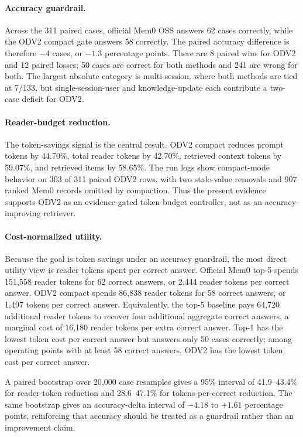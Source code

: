 \documentclass{article}
\begin{document}
\paragraph{Accuracy guardrail.}
Across the 311 paired cases, official Mem0 OSS answers 62 cases correctly, while the ODV2 compact gate answers 58 correctly. The paired accuracy difference is therefore $-4$ cases, or $-1.3$ percentage points. There are 8 paired wins for ODV2 and 12 paired losses; 50 cases are correct for both methods and 241 are wrong for both. The largest absolute category is multi-session, where both methods are tied at 7/133, but single-session-user and knowledge-update each contribute a two-case deficit for ODV2.

\paragraph{Reader-budget reduction.}
The token-savings signal is the central result. ODV2 compact reduces prompt tokens by 44.70\%, total reader tokens by 42.70\%, retrieved context tokens by 59.07\%, and retrieved items by 58.65\%. The run logs show compact-mode behavior on 303 of 311 paired ODV2 rows, with two stale-value removals and 907 ranked Mem0 records omitted by compaction. Thus the present evidence supports ODV2 as an evidence-gated token-budget controller, not as an accuracy-improving retriever.

\paragraph{Cost-normalized utility.}
Because the goal is token savings under an accuracy guardrail, the most direct utility view is reader tokens spent per correct answer. Official Mem0 top-5 spends 151{,}558 reader tokens for 62 correct answers, or 2{,}444 reader tokens per correct answer. ODV2 compact spends 86{,}838 reader tokens for 58 correct answers, or 1{,}497 tokens per correct answer. Equivalently, the top-5 baseline pays 64{,}720 additional reader tokens to recover four additional aggregate correct answers, a marginal cost of 16{,}180 reader tokens per extra correct answer. Top-1 has the lowest token cost per correct answer but answers only 50 cases correctly; among operating points with at least 58 correct answers, ODV2 has the lowest token cost per correct answer.

A paired bootstrap over 20{,}000 case resamples gives a 95\% interval of 41.9--43.4\% for reader-token reduction and 28.6--47.1\% for tokens-per-correct reduction. The same bootstrap gives an accuracy-delta interval of $-4.18$ to $+1.61$ percentage points, reinforcing that accuracy should be treated as a guardrail rather than an improvement claim.
\end{document}
